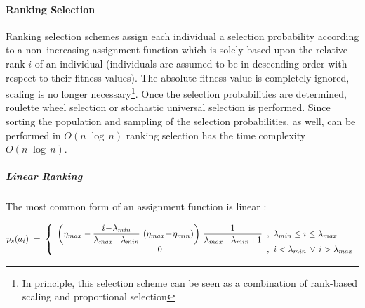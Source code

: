         \paragraph{Ranking Selection}

Ranking selection schemes assign each individual
a selection
probability according to a non--increasing assignment function which
is solely based upon the relative rank $i$ of an individual
(individuals are assumed to be in descending order with respect to
their fitness values).  The absolute fitness value is completely
ignored, scaling is no longer necessary\footnote{
In principle, this selection scheme can be seen as a combination of
rank-based scaling and proportional selection}.
Once the selection
probabilities are determined, roulette wheel selection or stochastic
universal selection is performed.  Since sorting the population and
sampling of the selection probabilities, as well, can be performed in
$O(n\;\log\,n)$ ranking selection has the time complexity
$O(n\;\log\,n)$.


\subparagraph{Linear Ranking} %

The most common form of an assignment function is linear
\cite{Baker:85,Grefenstette:89}:

\begin{equation}
    p_s(a_i) \; = \; \left\{
    \begin{array}{c@{\hspace{0.5em},\hspace{0.5em}}l}
            \left(\eta_{max} - \displaystyle\frac{i\!-\!\lambda_{min}}
              {\lambda_{max}\!-\!\lambda_{min}}\,
              \left(\eta_{max}\!-\!\eta_{min}\right)  
            \right)\,
            \displaystyle\frac{1}{\lambda_{max}\!-\!\lambda_{min}\!+\!1}
        & \lambda_{min} \le i \le \lambda_{max} \\[0.3em]
      0 & i < \lambda_{min} \, \vee \, i > \lambda_{max}
    \end{array}
  \right.
\end{equation}

